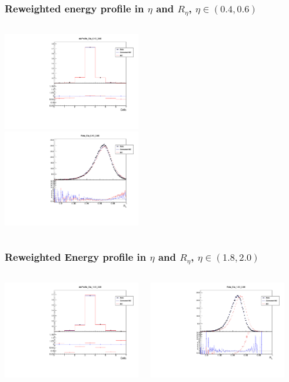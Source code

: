 \documentclass{beamer}
\begin{document}
\begin{frame}
\frametitle{Reweighted energy profile in $\eta$ and $R_\eta$,  $\eta \in (0.4, 0.6)$}

\begin{columns}[t]
\centering
\includegraphics[width=6cm]{etaProfile_Rew_Eta_4_6_Local_Rew.pdf}\\
\centering
\includegraphics[width=6cm]{Reta_Rew_Eta_4_6_Local_Rew.pdf}\\

\end{columns}
\end{frame}
\begin{frame}
\frametitle{Reweighted Energy profile in $\eta$ and $R_\eta$,  $\eta \in (1.8, 2.0)$}

\begin{columns}[t]
\centering
\includegraphics[width=6cm]{etaProfile_Rew_Eta_18_20_Local_Rew.pdf}

\centering
\includegraphics[width=6cm]{Reta_Rew_Eta_18_20_Local_Rew.pdf}
\end{columns}
\end{frame}
\end{document}
